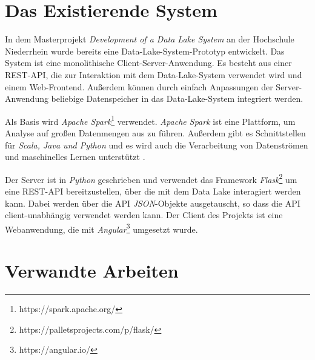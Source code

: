 \section{Das Existierende System}
In dem Masterprojekt \textit{Development of a Data Lake System} \parencite{datalake_proj} an der Hochschule Niederrhein wurde bereits eine Data-Lake-System-Prototyp entwickelt.
Das System ist eine monolithische Client-Server-Anwendung.
Es besteht aus einer REST-API, die zur Interaktion mit dem Data-Lake-System verwendet wird und einem Web-Frontend.
Außerdem können durch einfach Anpassungen der Server-Anwendung beliebige Datenspeicher in das Data-Lake-System integriert werden.

Als Basis wird \textit{Apache Spark}\footnote{https://spark.apache.org/} verwendet.
\textit{Apache Spark} ist eine Plattform, um Analyse auf großen Datenmengen aus zu führen.
Außerdem gibt es Schnittstellen für \textit{Scala, Java und Python} und es wird auch die Verarbeitung von Datenströmen und maschinelles Lernen unterstützt \parencite{spark}.

Der Server ist in \textit{Python} geschrieben und verwendet das Framework \textit{Flask}\footnote{https://palletsprojects.com/p/flask/} um eine REST-API bereitzustellen, über die mit dem Data Lake interagiert werden kann.
Dabei werden über die API \textit{JSON}-Objekte ausgetauscht, so dass die API client-unabhängig verwendet werden kann.
Der Client des Projekts ist eine Webanwendung, die mit \textit{Angular}\footnote{https://angular.io/} umgesetzt wurde.

\section{Verwandte Arbeiten}

